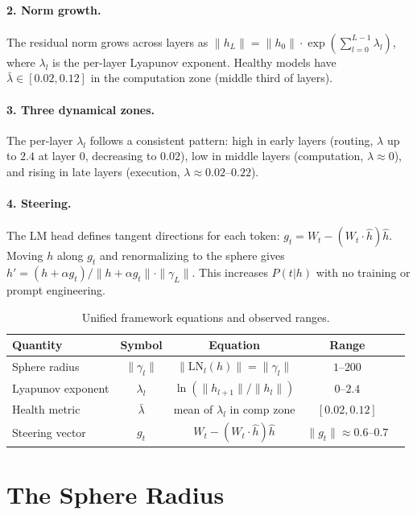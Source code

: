\documentclass{article}
\begin{document}
\paragraph{2. Norm growth.} The residual norm grows across layers as $\|h_L\| = \|h_0\| \cdot \exp(\sum_{l=0}^{L-1} \lambda_l)$, where $\lambda_l$ is the per-layer Lyapunov exponent. Healthy models have $\bar{\lambda} \in [0.02, 0.12]$ in the computation zone (middle third of layers).

\paragraph{3. Three dynamical zones.} The per-layer $\lambda_l$ follows a consistent pattern: high in early layers (routing, $\lambda$ up to $2.4$ at layer 0, decreasing to $0.02$), low in middle layers (computation, $\lambda \approx 0$), and rising in late layers (execution, $\lambda \approx 0.02\text{--}0.22$).

\paragraph{4. Steering.} The LM head defines tangent directions for each token: $g_t = W_t - (W_t \cdot \hat{h})\hat{h}$. Moving $h$ along $g_t$ and renormalizing to the sphere gives $h' = (h + \alpha g_t) / \|h + \alpha g_t\| \cdot \|\gamma_L\|$. This increases $P(t|h)$ with no training or prompt engineering.

\begin{table}[h]
\centering
\begin{tabular}{lcccc}
\toprule
\textbf{Quantity} & \textbf{Symbol} & \textbf{Equation} & \textbf{Range} \\
\midrule
Sphere radius & $\|\gamma_l\|$ & $\|\text{LN}_l(h)\| = \|\gamma_l\|$ & $1\text{--}200$ \\
Lyapunov exponent & $\lambda_l$ & $\ln(\|h_{l+1}\|/\|h_l\|)$ & $0\text{--}2.4$ \\
Health metric & $\bar{\lambda}$ & mean of $\lambda_l$ in comp zone & $[0.02, 0.12]$ \\
Steering vector & $g_t$ & $W_t - (W_t \cdot \hat{h})\hat{h}$ & $\|g_t\| \approx 0.6\text{--}0.7$ \\
\bottomrule
\end{tabular}
\caption{Unified framework equations and observed ranges.}
\end{table}

\section{The Sphere Radius}
\end{document}
